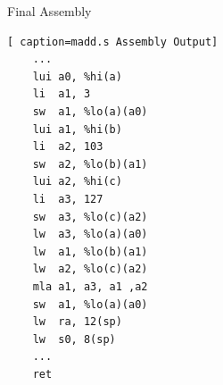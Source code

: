 \begin{frame}[fragile]{Final Assembly}
    \begin{lstlisting}[ caption=madd.s Assembly Output]
    ...
	lui	a0, %hi(a)
	li	a1, 3
	sw	a1, %lo(a)(a0)
	lui	a1, %hi(b)
	li	a2, 103
	sw	a2, %lo(b)(a1)
	lui	a2, %hi(c)
	li	a3, 127
	sw	a3, %lo(c)(a2)
	lw	a3, %lo(a)(a0)
	lw	a1, %lo(b)(a1)
	lw	a2, %lo(c)(a2)
	mla	a1, a3, a1 ,a2
	sw	a1, %lo(a)(a0)
	lw	ra, 12(sp)     
	lw	s0, 8(sp)      
    ...
	ret
\end{lstlisting}
\end{frame}
